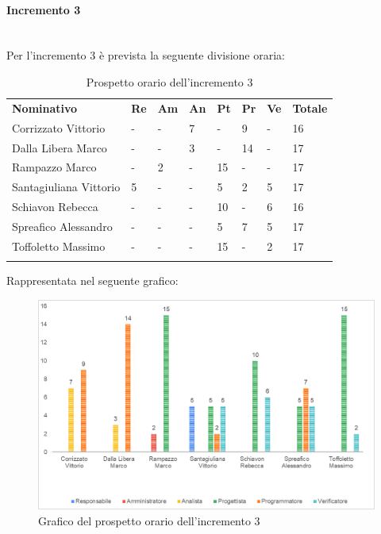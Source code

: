 \paragraph{Incremento 3} \mbox{} \\
Per l'incremento 3 è prevista la seguente divisione oraria:
\begin{longtable} {				
		>{}p{40mm}  
		>{}p{8mm}
		>{}p{8mm}
		>{}p{8mm}
		>{}p{8mm}
		>{}p{8mm}
		>{}p{8mm}
		>{}p{12mm}				
	}			
	\rowcolor{gray!50}
	\textbf{Nominativo} & \textbf{Re} & \textbf{Am} & \textbf{An} & \textbf{Pt} & \textbf{Pr} & \textbf{Ve} & \textbf{Totale}	\TBstrut \\ [2mm]
	Corrizzato Vittorio & - & - & 7 & - & 9 & - & 16 \TBstrut \\ [2mm]
	Dalla Libera Marco & - & - & 3 & - & 14 & - & 17 \TBstrut \\ [2mm]
	Rampazzo Marco & - & 2 & - & 15 & - & - & 17 \TBstrut \\ [2mm]
	Santagiuliana Vittorio & 5 & - & - & 5 & 2 & 5 & 17 \TBstrut \\ [2mm]
	Schiavon Rebecca & - & - & - & 10 & - & 6 & 16 \TBstrut \\ [2mm]
	Spreafico Alessandro & - & - & - & 5 & 7 & 5 & 17 \TBstrut \\ [2mm]
	Toffoletto Massimo & - & - & - & 15 & - & 2 & 17 \TBstrut \\ [2mm]
	\rowcolor{white}
	\caption{Prospetto orario dell'incremento 3}
\end{longtable}
Rappresentata nel seguente grafico:
\begin{figure} [H]
	\includegraphics[width=\linewidth]{./img/Grafici/17.png}
	\caption{Grafico del prospetto orario dell'incremento 3}
\end{figure}
